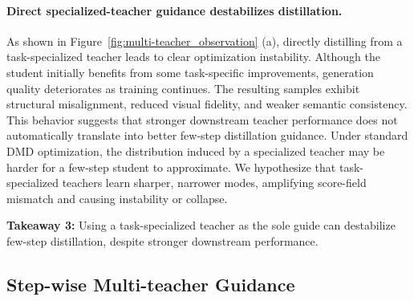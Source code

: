 \documentclass{llmxive}
\begin{document}
\paragraph{Direct specialized-teacher guidance destabilizes distillation.}
As shown in Figure~\ref{fig:multi-teacher_observation} (a), directly distilling from a task-specialized teacher leads to clear optimization instability. Although the student initially benefits from some task-specific improvements, generation quality deteriorates as training continues. The resulting samples exhibit structural misalignment, reduced visual fidelity, and weaker semantic consistency. This behavior suggests that stronger downstream teacher performance does not automatically translate into better few-step distillation guidance. Under standard DMD optimization, the distribution induced by a specialized teacher may be harder for a few-step student to approximate. We hypothesize that task-specialized teachers learn sharper, narrower modes, amplifying score-field mismatch and causing instability or collapse.


\begin{tcolorbox}[
colback=blue!3,
colframe=blue!70!black,
boxrule=0.8pt,
arc=6pt,
left=6pt,
right=6pt,
top=4pt,
bottom=4pt
]
\textbf{Takeaway 3:} Using a task-specialized teacher as the sole guide can destabilize few-step distillation, despite stronger downstream performance.
\end{tcolorbox}


\subsection{Step-wise Multi-teacher Guidance}
\end{document}
